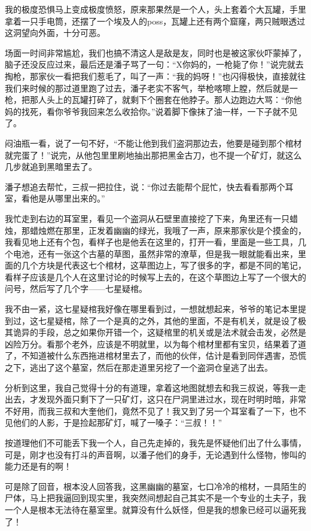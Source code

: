 我的极度恐惧马上变成极度愤怒，原来那果然是一个人，头上套着个大瓦罐，手里拿着一只手电筒，还摆了一个埃及人的poss，瓦罐上还有两个窟窿，两只贼眼透过这洞望向外面，十分可恶。

场面一时间非常尴尬，我们也搞不清这人是敌是友，同时也是被这家伙吓蒙掉了，脑子还没反应过来，最后还是潘子骂了一句：“X你妈的，一枪毙了你！”说完就去掏枪，那家伙一看把我们惹毛了，叫了一声：“我的妈呀！”也闪得极快，直接就往我们来时候的那过道里跑了过去，潘子老实不客气，举枪喀嚓上膛，然后就是一枪，把那人头上的瓦罐打碎了，就剩下个圈套在他脖子。那人边跑边大骂：“你他妈的找死，看你爷爷我回来怎么收拾你。”说着脚下像抹了油一样，一下子就不见了。

闷油瓶一看，说了一句不好，“不能让他到我们盗洞那边去，他要是碰到那个棺材就完蛋了！”说完，从他包里里刷地抽出那把黑金古刀，也不提一个矿灯，就这么几步就追到黑暗里去了。

潘子想追去帮忙，三叔一把拉住，说：“你过去能帮个屁忙，快去看看那两个耳室，看他是从哪里出来的。”

我忙走到右边的耳室里，看见一个盗洞从石壁里直接挖了下来，角里还有一只蜡烛，那蜡烛燃在那里，正发着幽幽的绿光，我哦了一声，原来那家伙是个摸金的，我看见地上还有个包，看样子也是他丢在这里的，打开一看，里面是一些工具，几个电池，还有一张这个古墓的草图，虽然非常的潦草，但是我一眼就能看出来，里面的几个方块是代表这七个棺材，这草图边上，写了很多的字，都是不同的笔记，看样子应该是几个人在这里讨论的时候写上去的，在这个草图边上写了一个很大的问号，然后写了几个字——七星疑棺。

我不由一紧，这七星疑棺我好像在哪里看到过，一想就想起来，爷爷的笔记本里提到过，这七星疑棺，除了一个是真的之外，其他的里面，不是有机关，就是设了极其诡异的手段，总之如果你开错一个，这疑棺里的机关或是法术就会击发，必然是凶险万分。看那个老外，应该是不明就里，以为每个棺材里都有宝贝，结果着了道了，不知道被什么东西拖进棺材里去了，而他的伙伴，估计是看到同伴遇害，恐慌之下，逃出了这个墓室，然后在那走道里另挖了一个盗洞仓皇逃了出去。

分析到这里，我自己觉得十分的有道理，拿着这地图就想去和我三叔说，等我一走出去，才发现外面只剩下了一只矿灯，这只在尸洞里进过水，现在时明时暗，非常不好用，而我三叔和大奎他们，竟然不见了！我又到了另一个耳室看了一下，也不见他们的人影，于是捡起那矿灯，喊了一嗓子：“三叔！！”

按道理他们不可能丢下我一个人，自己先走掉的，我先是怀疑他们出了什么事情，可是，刚才也没有打斗的声音啊，以潘子他们的身手，无论遇到什么怪物，惨叫的能力还是有的啊！

可是除了回音，根本没人回答我，这黑幽幽的墓室，七口冷冷的棺材，一具陌生的尸体，马上把我逼回到现实里，我突然间想起自己其实不是一个专业的土夫子，我一个人是根本无法待在墓室里。就算没有什么妖怪，但是我的想象已经可以逼死我了！

